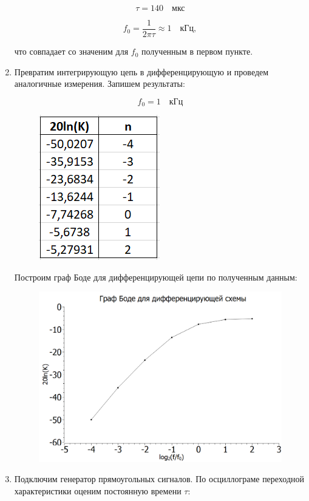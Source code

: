 \documentclass[a4paper, 12pt]{article}%
\begin{document}
\begin{enumerate}
\[\tau = 140 \quad \textit{мкс}\]

\[f_0 = \frac{1}{2\pi\tau} \approx 1 \quad \textit{кГц},\]

что совпадает со значеним для $f_0$ полученным в первом пункте.

\item Превратим интегрирующую цепь в дифференцирующую и проведем аналогичные измерения. Запишем результаты:

\[f_0 = 1 \quad \textit{кГц}\]

\begin{figure}[h!]
\centering
\includegraphics[scale=1]{table2.png}
\label{fig:Image1}
\end{figure}

Построим граф Боде для дифференцирующей цепи по полученным данным:

\begin{figure}[h!]
\centering
\includegraphics[scale=0.5]{graph2.png}
\label{fig:Image1}
\end{figure}

\item Подключим генератор прямоугольных сигналов. По осциллограме переходной характеристики оценим постоянную времени $\tau$:


\end{enumerate}
\end{document}
